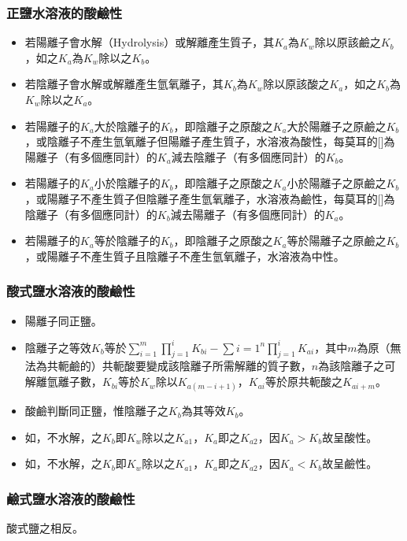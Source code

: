 \documentclass[a4paper,12pt]{article}
\begin{document}
\subsubsection{正鹽水溶液的酸鹼性}
\begin{itemize}
\item 若陽離子會水解（Hydrolysis）或解離產生質子，其$K_a$為$K_w$除以原該鹼之$K_b$，如之$K_a$為$K_w$除以之$K_b$。
\item 若陰離子會水解或解離產生氫氧離子，其$K_b$為$K_w$除以原該酸之$K_a$，如之$K_b$為$K_w$除以之$K_a$。
\item 若陽離子的$K_a$大於陰離子的$K_b$，即陰離子之原酸之$K_a$大於陽離子之原鹼之$K_b$，或陰離子不產生氫氧離子但陽離子產生質子，水溶液為酸性，每莫耳的[]為陽離子（有多個應同計）的$K_a$減去陰離子（有多個應同計）的$K_b$。
\item 若陽離子的$K_a$小於陰離子的$K_b$，即陰離子之原酸之$K_a$小於陽離子之原鹼之$K_b$，或陽離子不產生質子但陰離子產生氫氧離子，水溶液為鹼性，每莫耳的[]為陰離子（有多個應同計）的$K_b$減去陽離子（有多個應同計）的$K_a$。
\item 若陽離子的$K_a$等於陰離子的$K_b$，即陰離子之原酸之$K_a$等於陽離子之原鹼之$K_b$，或陽離子不產生質子且陰離子不產生氫氧離子，水溶液為中性。
\end{itemize}
\subsubsection{酸式鹽水溶液的酸鹼性}
\begin{itemize}
\item 陽離子同正鹽。
\item 陰離子之等效$K_b$等於$\sum_{i=1}^m\prod_{j=1}^iK_{bi}-\sum{i=1}^n\prod_{j=1}^iK_{ai}$，其中$m$為原（無法為共軛鹼的）共軛酸要變成該陰離子所需解離的質子數，$n$為該陰離子之可解離氫離子數，$K_{bi}$等於$K_w$除以$K_{a(m-i+1)}$，$K_{ai}$等於原共軛酸之$K_{ai+m}$。
\item 酸鹼判斷同正鹽，惟陰離子之$K_b$為其等效$K_b$。
\item 如，不水解，之$K_b$即$K_w$除以之$K_{a1}$，$K_a$即之$K_{a2}$，因$K_a>K_b$故呈酸性。
\item 如，不水解，之$K_b$即$K_w$除以之$K_{a1}$，$K_a$即之$K_{a2}$，因$K_a<K_b$故呈鹼性。
\end{itemize}
\subsubsection{鹼式鹽水溶液的酸鹼性}
酸式鹽之相反。
\end{document}
